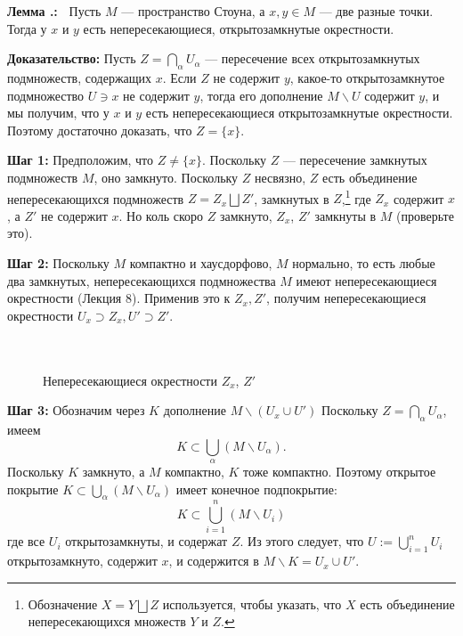\documentclass[12pt]{book}
\theoremstyle{upshape}
\theoremstyle{generic}
\theoremstyle{upshapenonumber}
\newcommand{\следствие}{%
     \refstepcounter{teorema}
     {\noindent\bf Следствие \thechapter.\arabic{teorema}:\ }}
\newcommand{\пример}{%
     \refstepcounter{teorema}
     {\noindent\bf Пример \thechapter.\arabic{teorema}:\ }}
\newcommand{\лемма}{%
     \refstepcounter{teorema}
     {\noindent\bf Лемма \thechapter.\arabic{teorema}:\ }}
\newcommand{\теорема}{%
     \refstepcounter{teorema}
     {\noindent\bf Теорема \thechapter.\arabic{teorema}:\ }}
\newcommand{\утверждение}{%
     \refstepcounter{teorema}
     {\noindent\bf Утверждение \thechapter.\arabic{teorema}:\ }}
\def\хфилл{\hfill}
\def\ноиндент{\noindent}
\def\бф{\bf}
\begin{document}
\лемма\label{_Okrestnosti_otkrytoza_neper_Lemma_}
Пусть $M$ --- пространство Стоуна, а $x,y \in M$ --- две разные точки.
Тогда у $x$ и $y$ есть непересекающиеся, открытозамкнутые окрестности.

\хфилл

\ноиндент
{\бф Доказательство:} 
Пусть $Z=\bigcap_\alpha U_\alpha$ --- пересечение всех 
открытозамкнутых подмножеств, содержащих $x$. Если $Z$
не содержит $y$, какое-то открытозамкнутое подмножество
$U\ni x$ не содержит $y$, тогда его дополнение $M\backslash U$ 
содержит $y$, и мы получим, что у $x$ и $y$ есть
 непересекающиеся открытозамкнутые окрестности. Поэтому достаточно
доказать, что $Z=\{x\}$.

\хфилл

\ноиндент
{\бф Шаг 1:}
Предположим, что $Z\neq \{x\}$. Поскольку  $Z$ --- пересечение
замкнутых подмножеств $M$, оно замкнуто. 
Поскольку $Z$ несвязно, $Z$ есть объединение 
непересекающихся подмножеств $Z = Z_x\bigsqcup Z'$,
замкнутых в $Z$,\footnote{Обозначение
$X = Y \bigsqcup Z$ используется, чтобы указать,
что $X$ есть объединение непересекающихся множеств $Y$ и $Z$.}
где $Z_x$ содержит $x$, а $Z'$ не содержит $x$.
 Но коль скоро $Z$ замкнуто, $Z_x$, $Z'$ замкнуты
в $M$ (проверьте это). 

\хфилл

\ноиндент
{\бф Шаг 2:}
Поскольку $M$ компактно и хаусдорфово,
$M$ нормально, то есть любые два замкнутых, непересекающихся
подмножества $M$ имеют непересекающиеся окрестности
(Лекция 8). Применив это к $Z_x, Z'$, получим
непересекающиеся окрестности $U_x\supset Z_x, U'\supset
Z'$. 


\begin{figure}[ht]
\begin{center}\ \\
\\
{\small  Непересекающиеся окрестности $Z_x$, $Z'$}
\end{center}
\end{figure}



\хфилл

\ноиндент
{\бф Шаг 3:}
Обозначим через $K$ дополнение $M \backslash (U_x \cup U')$
Поскольку $Z=\bigcap_\alpha U_\alpha$,
имеем
\[
K\subset \bigcup_\alpha (M\backslash U_\alpha).
\]
Поскольку $K$ замкнуто, а $M$ компактно, $K$ тоже 
компактно. Поэтому открытое покрытие 
$K\subset\bigcup_\alpha (M\backslash U_\alpha)$ имеет конечное
подпокрытие:
\[
K \subset \bigcup_{i=1}^n (M\backslash U_i)
\]
где все $U_i$ открытозамкнуты, и содержат $Z$.
Из этого следует, что $U:=\bigcup_{i=1}^n U_i$
открытозамкнуто, содержит $x$, и содержится в 
$M \backslash K=U_x \cup U'$.
\end{document}

